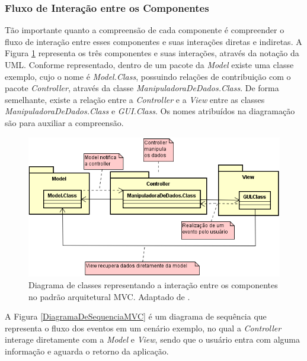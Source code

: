 \subsubsection{Fluxo de Interação entre os Componentes}

Tão importante quanto a compreensão de cada componente é compreender o fluxo de interação entre esses componentes e suas interações diretas e indiretas. A Figura \ref{DiagramaDeClasseMVC} representa os três componentes e suas interações, através da notação da UML. Conforme representado, dentro de um pacote da \textit{Model} existe uma classe exemplo, cujo o nome é \textit{Model.Class}, possuindo relações de contribuição com o pacote \textit{Controller}, através da classe \textit{ManipuladoraDeDados.Class}. De forma semelhante, existe a relação entre a \textit{Controller} e a \textit{View} entre as classes  \textit{ManipuladoraDeDados.Class} e \textit{GUI.Class}. Os nomes atribuídos na diagramação são para auxiliar a compreensão. 

\begin{figure}[h!]
	\centering
	\includegraphics[keepaspectratio=true,scale=0.9]{figuras/DiagramaDeClasseMVC.PNG}
	\caption{Diagrama de classes representando a interação entre os componentes no padrão arquitetural MVC. Adaptado de \cite{durelli2008proposta}.}
	\label{DiagramaDeClasseMVC}
\end{figure}

\pagebreak

A Figura \ref{DiagramaDeSequenciaMVC} é um diagrama de sequência que representa o fluxo dos eventos em um cenário exemplo, no qual a \textit{Controller} interage diretamente com a \textit{Model} e \textit{View}, sendo que o usuário entra com alguma informação e aguarda o retorno da aplicação. 


